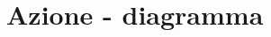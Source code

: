 \documentclass[a4paper, 15pt]{article}
\begin{document}
\section{Azione - diagramma}
\newpage
\end{document}
